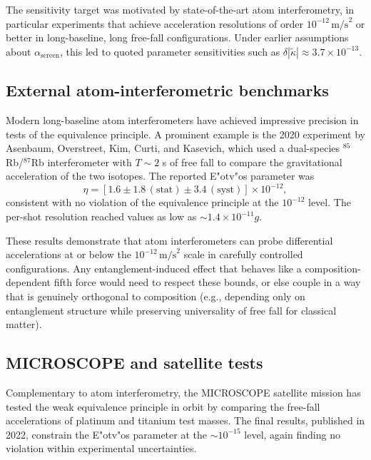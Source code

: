 \documentclass[11pt]{article}
\begin{document}
The sensitivity target was motivated by state-of-the-art atom interferometry, in particular experiments that achieve acceleration resolutions of order $10^{-12}\,\text{m/s}^2$ or better in long-baseline, long free-fall configurations. Under earlier assumptions about $\alpha_{\text{screen}}$, this led to quoted parameter sensitivities such as $\delta|\tilde{\kappa}|\approx 3.7\times 10^{-13}$.

\subsection{External atom-interferometric benchmarks}

Modern long-baseline atom interferometers have achieved impressive precision in tests of the equivalence principle. A prominent example is the 2020 experiment by Asenbaum, Overstreet, Kim, Curti, and Kasevich, which used a dual-species $^{85}$Rb/$^{87}$Rb interferometer with $T\sim 2$ s of free fall to compare the gravitational acceleration of the two isotopes. The reported E"otv"os parameter was
\begin{equation}
 \eta = [1.6 \pm 1.8\,(\text{stat}) \pm 3.4\,(\text{syst})]\times 10^{-12},
\end{equation}
consistent with no violation of the equivalence principle at the $10^{-12}$ level. The per-shot resolution reached values as low as $\sim 1.4\times 10^{-11} g$.

These results demonstrate that atom interferometers can probe differential accelerations at or below the $10^{-12}\,\text{m/s}^2$ scale in carefully controlled configurations. Any entanglement-induced effect that behaves like a composition-dependent fifth force would need to respect these bounds, or else couple in a way that is genuinely orthogonal to composition (e.g., depending only on entanglement structure while preserving universality of free fall for classical matter).

\subsection{MICROSCOPE and satellite tests}

Complementary to atom interferometry, the MICROSCOPE satellite mission has tested the weak equivalence principle in orbit by comparing the free-fall accelerations of platinum and titanium test masses. The final results, published in 2022, constrain the E"otv"os parameter at the $\sim 10^{-15}$ level, again finding no violation within experimental uncertainties.
\end{document}
